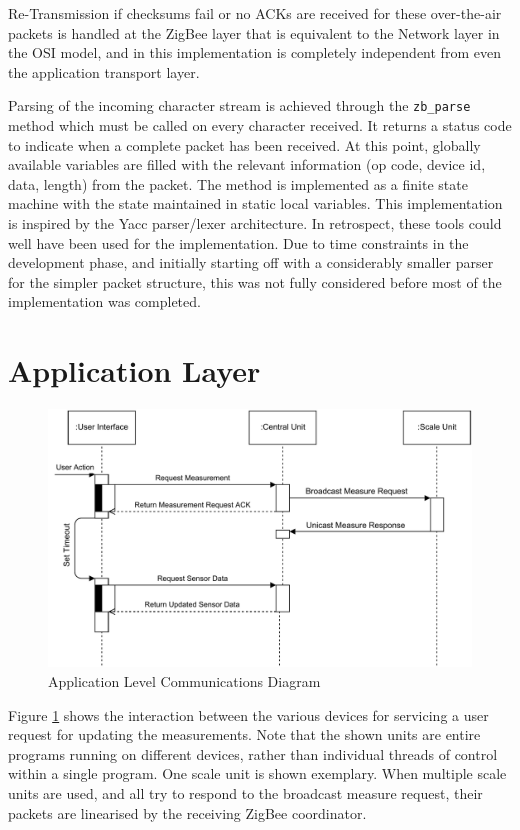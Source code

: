 Re-Transmission if checksums fail or no ACKs are received for these over-the-air packets is handled at the ZigBee layer that is equivalent to the Network layer in the OSI model, and in this implementation is completely independent from even the application transport layer.

Parsing of the incoming character stream is achieved through the \texttt{zb\_parse} method which must be called on every character received. It returns a status code to indicate when a complete packet has been received. At this point, globally available variables are filled with the relevant information (op code, device id, data, length) from the packet. The method is implemented as a finite state machine with the state maintained in static local variables. This implementation is inspired by the Yacc parser/lexer architecture\cite{yacc}. In retrospect, these tools could well have been used for the implementation. Due to time constraints in the development phase, and initially starting off with a considerably smaller parser for the simpler packet structure, this was not fully considered before most of the implementation was completed. 

\section{Application Layer}

\begin{figure}
\includegraphics[width=\textwidth]{images/communications-diagram.pdf}
\caption{Application Level Communications Diagram}
\label{communications-diagram}
\end{figure}

Figure \ref{communications-diagram} shows the interaction between the various devices for servicing a user request for updating the measurements. Note that the shown units are entire programs running on different devices, rather than individual threads of control within a single program. One scale unit is shown exemplary. When multiple scale units are used, and all try to respond to the broadcast measure request, their packets are linearised by the receiving ZigBee coordinator.

